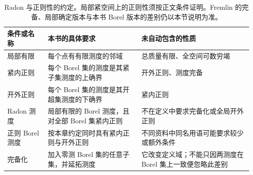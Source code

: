 \begin{table}[htbp]
\centering\small\renewcommand{\arraystretch}{1.18}\setlength{\tabcolsep}{4pt}
\caption[Radon 与正则性的约定]{Radon 与正则性的约定。局部紧空间上的正则性须按正文条件证明。Fremlin 的完备、局部确定版本与本书 Borel 版本的差别仍以本节说明为准。}
\label{b1:tab:visual-t07}
\begin{tabularx}{\linewidth}{@{}>{\raggedright\arraybackslash}p{3.1cm}>{\raggedright\arraybackslash}p{4.7cm}>{\raggedright\arraybackslash}X@{}}
\toprule
条件或名称 & 本书的具体要求 & 未自动包含的性质 \\
\midrule
局部有限 & 每个点有有限测度的邻域 & 总质量有限、全空间可数穷竭 \\
紧内正则 & 每个 Borel 集的测度是其紧子集测度的上确界 & 开外正则、测度完备 \\
开外正则 & 每个 Borel 集的测度是其开超集测度的下确界 & 紧内正则 \\
Radon 测度 & 局部有限的 Borel 测度，且对全部 Borel 集紧内正则 & 不在定义中要求完备化或全局开外正则 \\
正则 Borel 测度 & 按本章约定同时具有紧内正则与开外正则 & 不同资料中同名用语可能要求较少或额外条件 \\
完备化 & 加入零测 Borel 集的任意子集，并延拓测度 & 它改变定义域；不能只因两测度在 Borel 集上一致便忽略此差别 \\
\bottomrule
\end{tabularx}
\end{table}
